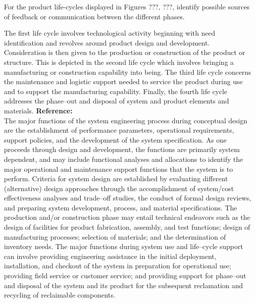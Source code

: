 \begin{exercises}
    \begin{exercise}
    \label{sea-02-11}
        For the product life-cycles displayed in Figures ???, ???, identify possible sources of feedback or communication between the different phases.
    \end{exercise}
    \begin{solution}
        The first life cycle involves technological activity beginning with need identification and revolves around product design and development. Consideration is then given to the production or construction of the product or structure. This is depicted in the second life cycle which involves bringing a manufacturing or construction capability into being. The third life cycle concerns the maintenance and logistic support needed to service the product during use and to support the manufacturing capability. Finally, the fourth life cycle addresses the phase–out and disposal of system and product elements and materials. \textbf{Reference:}\\
        The major functions of the system engineering process during conceptual design are the establishment of performance parameters, operational requirements, support policies, and the development of the system specification. As one proceeds through design and development, the functions are primarily system dependent, and may include functional analyses and allocations to identify the major operational and maintenance support functions that the system is to perform. Criteria for system design are established by evaluating different (alternative) design approaches through the accomplishment of system/cost effectiveness analyses and trade–off studies, the conduct of formal design reviews, and preparing system development, process, and material specifications. The production and/or construction phase may entail technical endeavors such as the design of facilities for product fabrication, assembly, and test functions; design of manufacturing processes; selection of materials; and the determination of inventory needs. The major functions during system use and life–cycle support can involve providing engineering assistance in the initial deployment, installation, and checkout of the system in preparation for operational use; providing field service or customer service; and providing support for phase–out and disposal of the system and its product for the subsequent reclamation and recycling of reclaimable components.
    \end{solution}
    

\end{exercises}
